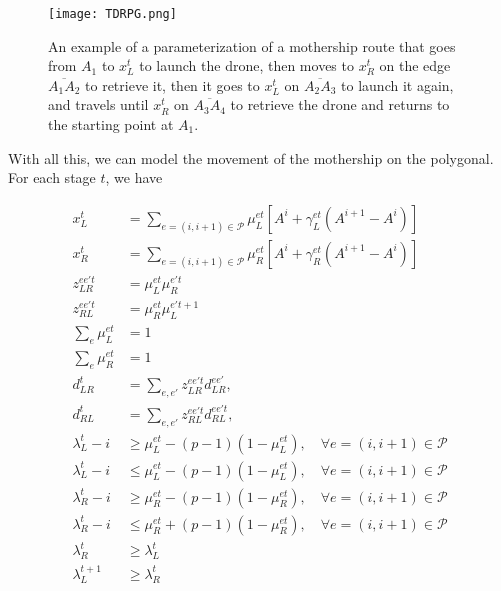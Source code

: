 \begin{figure}[h!]
\begin{center}
 \texttt{[image: TDRPG.png]}
\end{center}
\caption{An example of a parameterization of a mothership route that goes from $A_1$ to $x_L^t$ to launch the drone, then moves to $x_R^t$ on the edge $\overline{A_1A_2}$ to retrieve it, then it goes to $x_L^t$ on $\overline{A_2A_3}$ to launch it again, and travels until $x_R^t$ on $\overline{A_3A_4}$ to retrieve the drone and returns to the starting point at $A_1$.\label{fig:ex1}}
\end{figure}

With all this, we can model the movement of the mothership on the polygonal. For each stage $t$, we have

\begin{align}
    x_L^t & = \sum_{e=(i, i+1)\in\mathcal P} \mu_{L}^{et}\left[A^i + \gamma_L^{et}(A^{i+1} - A^i)\right]\label{param1}\\
    x_R^t & = \sum_{e=(i, i+1)\in\mathcal P} \mu_{R}^{et}\left[ A^i + \gamma_R^{et}(A^{i+1} - A^i)\right]\label{param2}\\
    z_{LR}^{ee't} & = \mu_{L}^{et}\mu_{R}^{e't}\label{pol:prodLR}\\
    z_{RL}^{ee't} & = \mu_{R}^{et}\mu_{L}^{e't+1}\label{pol:prodRL}\\
    \sum_{e} \mu_{L}^{et} & = 1  \label{muL} \\
    \sum_{e} \mu_{R}^{et} & = 1 \label{muR}\\
    d_{LR}^t & = \sum_{e, e'} z_{LR}^{ee't} d_{LR}^{ee'} \label{pol:dLRt},\\
    d_{RL}^t & = \sum_{e, e'} z_{RL}^{ee't} d_{RL}^{ee't} \label{pol:dRLt},\\
    \lambda_L^t - i & \geq \mu_{L}^{et} - (p-1)(1-\mu_{L}^{et}), \quad \forall e=(i, i+1)\in\mathcal P \label{lambdaLg}\\
    \lambda_L^t - i & \leq \mu_{L}^{et} - (p-1)(1-\mu_{L}^{et}), \quad \forall e=(i, i+1)\in\mathcal P \label{lambdaLl}\\
    \lambda_R^t - i & \geq \mu_{R}^{et} - (p-1)(1-\mu_{R}^{et}), \quad \forall e=(i, i+1)\in\mathcal P \label{lambdaRg}\\
    \lambda_R^t - i & \leq \mu_{R}^{et} + (p-1)(1-\mu_{R}^{et}), \quad \forall e=(i, i+1)\in\mathcal P \label{lambdaRl}\\
    \lambda_R^t & \geq \lambda_L^t \label{lambdaRL}\\
    \lambda_L^{t+1} & \geq \lambda_R^t \label{lambdaLR}
\end{align}

